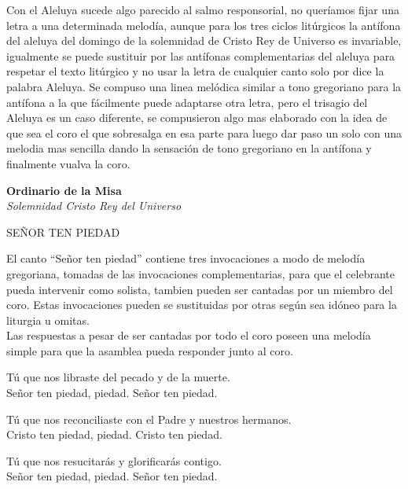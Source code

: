 \documentclass[12pt, letterpaper]{report}
\begin{document}
    Con el Aleluya sucede algo parecido al salmo responsorial, no quer\'iamos fijar una letra a una determinada melod\'ia, aunque para los tres ciclos lit\'urgicos la ant\'ifona del aleluya del domingo de la solemnidad de Cristo Rey de Universo es invariable, igualmente se puede sustituir por las ant\'ifonas complementarias del aleluya para respetar el texto lit\'urgico y no usar la letra de cualquier canto solo por dice la palabra Aleluya. Se compuso una linea mel\'odica similar a tono gregoriano para la ant\'ifona a la que f\'acilmente puede adaptarse otra letra,
    pero el trisagio del Aleluya es un caso diferente, se compusieron algo mas elaborado con la idea de que sea el coro el que sobresalga en esa parte para luego dar paso un solo con una melodia mas sencilla dando la sensaci\'on de tono gregoriano en la ant\'ifona y finalmente vualva la coro.
    \clearpage

    \begin{center}
      \vspace*{8cm}
      \textbf{\Huge Ordinario de la Misa}\\
      \textit{\Large Solemnidad Cristo Rey del Universo}
    \end{center}
    \clearpage

    \begin{center}
      {\large SE\~NOR TEN PIEDAD}
    \end{center}

    El canto ``Se\~nor ten piedad'' contiene tres invocaciones a modo de melod\'ia gregoriana, tomadas de las invocaciones complementarias, para que el celebrante pueda intervenir como solista, tambien pueden ser cantadas por un miembro del coro. Estas invocaciones pueden se sustituidas por otras seg\'un sea id\'oneo para la liturgia u omitas.\\ Las respuestas a pesar de ser cantadas por todo el coro poseen una melod\'ia simple para que la asamblea pueda responder junto al coro.

    \noindent
    T\'u que nos libraste del pecado y de la muerte.\\ Se\~nor ten piedad, piedad. Se\~nor ten piedad.

    \noindent
    T\'u que nos reconciliaste con el Padre y nuestros hermanos.\\ Cristo ten piedad, piedad. Cristo ten piedad.

    \noindent
    T\'u que nos resucitar\'as y glorificar\'as contigo.\\ Se\~nor ten piedad, piedad. Se\~nor ten piedad.
    \clearpage
\end{document}
